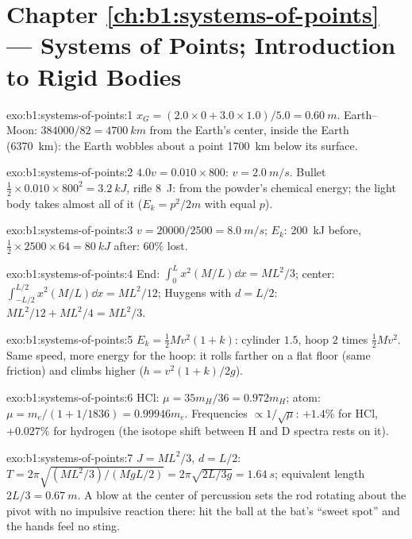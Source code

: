 \section*{Chapter \ref{ch:b1:systems-of-points} --- Systems of Points; Introduction to Rigid Bodies}

\begin{solution}{exo:b1:systems-of-points:1}
$x_G = (2.0 \times 0 + 3.0 \times 1.0)/5.0 = \qty{0.60}{m}$. Earth--Moon:
$384000/82 = \qty{4700}{km}$ from the Earth's center, inside the Earth
(\qty{6370}{km}): the Earth wobbles about a point \qty{1700}{km} below
its surface.
\end{solution}

\begin{solution}{exo:b1:systems-of-points:2}
$4.0v = 0.010 \times 800$: $v = \qty{2.0}{m/s}$. Bullet $\tfrac12 \times 0.010
\times 800^2 = \qty{3.2}{kJ}$, rifle \qty{8}{J}: from the powder's
chemical energy; the light body takes almost all of it ($E_k = p^2/2m$
with equal $p$).
\end{solution}

\begin{solution}{exo:b1:systems-of-points:3}
$v = 20000/2500 = \qty{8.0}{m/s}$; $E_k$: \qty{200}{kJ} before, $\tfrac12 \times
2500 \times 64 = \qty{80}{kJ}$ after: $60\%$ lost.
\end{solution}

\begin{solution}{exo:b1:systems-of-points:4}
End: $\int_0^L x^2(M/L)\dd x = ML^2/3$; center: $\int_{-L/2}^{L/2}x^2(M/L)
\dd x = ML^2/12$; Huygens with $d = L/2$: $ML^2/12 + ML^2/4 = ML^2/3$.
\end{solution}

\begin{solution}{exo:b1:systems-of-points:5}
$E_k = \tfrac12 Mv^2(1 + k)$: cylinder $1.5$, hoop $2$ times $\tfrac12 Mv^2$.
Same speed, more energy for the hoop: it rolls farther on a flat floor
(same friction) and climbs higher ($h = v^2(1 + k)/2g$).
\end{solution}

\begin{solution}{exo:b1:systems-of-points:6}
HCl: $\mu = 35m_H/36 = 0.972m_H$; atom: $\mu = m_e/(1 + 1/1836) =
0.99946m_e$. Frequencies $\propto 1/\sqrt\mu$: $+1.4\%$ for HCl, $+0.027\%$
for hydrogen (the isotope shift between H and D spectra rests on it).
\end{solution}

\begin{solution}{exo:b1:systems-of-points:7}
$J = ML^2/3$, $d = L/2$: $T = 2\pi\sqrt{(ML^2/3)/(MgL/2)} = 2\pi\sqrt{2L/3g}
= \qty{1.64}{s}$; equivalent length $2L/3 = \qty{0.67}{m}$. A blow at the
center of percussion sets the rod rotating about the pivot with no
impulsive reaction there: hit the ball at the bat's ``sweet spot'' and
the hands feel no sting.
\end{solution}

